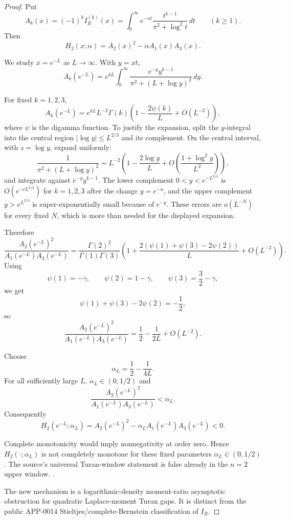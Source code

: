 \begin{proof}
Put
\[
A_k(x)=(-1)^k I_R^{(k)}(x)
=\int_0^\infty e^{-xt}\frac{t^{k-1}}{\pi^2+\log^2 t}\,dt
\qquad (k\ge1).
\]
Then
\[
H_2(x;\alpha)=A_2(x)^2-\alpha A_1(x)A_3(x).
\]

We study \(x=e^{-L}\) as \(L\to\infty\). With \(y=xt\),
\[
A_k(e^{-L})
=
e^{kL}\int_0^\infty
\frac{e^{-y}y^{k-1}}
{\pi^2+(L+\log y)^2}\,dy.
\]

For fixed \(k=1,2,3\),
\[
A_k(e^{-L})
=
e^{kL}L^{-2}\Gamma(k)
\left(1-\frac{2\psi(k)}{L}+O(L^{-2})\right),
\]
where \(\psi\) is the digamma function. To justify the expansion, split the \(y\)-integral into the central region \(|\log y|\le L^{2/3}\) and its complement. On the central interval, with \(z=\log y\), expand uniformly:
\[
\frac{1}{\pi^2+(L+\log y)^2}
=
L^{-2}\left(1-\frac{2\log y}{L}+O\left(\frac{1+\log^2 y}{L^2}\right)\right),
\]
and integrate against \(e^{-y}y^{k-1}\). The lower complement \(0<y<e^{-L^{2/3}}\) is \(O(e^{-cL^{2/3}})\) for \(k=1,2,3\) after the change \(y=e^{-u}\), and the upper complement \(y>e^{L^{2/3}}\) is super-exponentially small because of \(e^{-y}\). These errors are \(o(L^{-N})\) for every fixed \(N\), which is more than needed for the displayed expansion.

Therefore
\[
\frac{A_2(e^{-L})^2}{A_1(e^{-L})A_3(e^{-L})}
=
\frac{\Gamma(2)^2}{\Gamma(1)\Gamma(3)}
\left(
1+\frac{2(\psi(1)+\psi(3)-2\psi(2))}{L}+O(L^{-2})
\right).
\]
Using
\[
\psi(1)=-\gamma,\qquad
\psi(2)=1-\gamma,\qquad
\psi(3)=\frac32-\gamma,
\]
we get
\[
\psi(1)+\psi(3)-2\psi(2)=-\frac12,
\]
so
\[
\frac{A_2(e^{-L})^2}{A_1(e^{-L})A_3(e^{-L})}
=
\frac12-\frac{1}{2L}+O(L^{-2}).
\]

Choose
\[
\alpha_L=\frac12-\frac{1}{4L}.
\]
For all sufficiently large \(L\), \(\alpha_L\in(0,1/2)\) and
\[
\frac{A_2(e^{-L})^2}{A_1(e^{-L})A_3(e^{-L})}<\alpha_L.
\]
Consequently
\[
H_2(e^{-L};\alpha_L)
=
A_2(e^{-L})^2-\alpha_L A_1(e^{-L})A_3(e^{-L})
<0.
\]

Complete monotonicity would imply nonnegativity at order zero. Hence \(H_2(\cdot;\alpha_L)\) is not completely monotone for these fixed parameters \(\alpha_L\in(0,1/2)\). The source's universal Turan-window statement is false already in the \(n=2\) upper window. \cite{mishra-swaminathan-ramanujan}.

The new mechanism is a logarithmic-density moment-ratio asymptotic obstruction for quadratic Laplace-moment Turan gaps. It is distinct from the public APP-0014 Stieltjes/complete-Bernstein classification of \(I_R\).
\end{proof}

